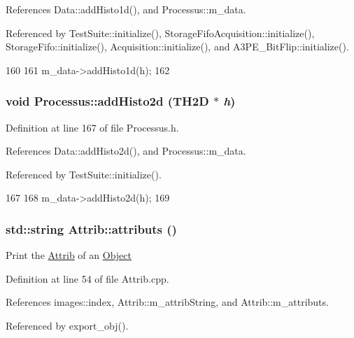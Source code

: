 References Data::addHisto1d(), and Processus::m\_\-data.

Referenced by TestSuite::initialize(), StorageFifoAcquisition::initialize(), StorageFifo::initialize(), Acquisition::initialize(), and A3PE\_\-BitFlip::initialize().


\begin{DoxyCode}
160                            {
161     m_data->addHisto1d(h);
162   }
\end{DoxyCode}
\hypertarget{classProcessus_ac1ed1aed5edaeabdf18aa56775440471}{
\subsubsection[{addHisto2d}]{\setlength{\rightskip}{0pt plus 5cm}void Processus::addHisto2d (TH2D $\ast$ {\em h})}}
\label{classProcessus_ac1ed1aed5edaeabdf18aa56775440471}


Definition at line 167 of file Processus.h.

References Data::addHisto2d(), and Processus::m\_\-data.

Referenced by TestSuite::initialize().


\begin{DoxyCode}
167                            {
168     m_data->addHisto2d(h);
169   }
\end{DoxyCode}
\hypertarget{classAttrib_aee7bbf16b144887f196e1341b24f8a26}{
\subsubsection[{attributs}]{\setlength{\rightskip}{0pt plus 5cm}std::string Attrib::attributs ()}}
\label{classAttrib_aee7bbf16b144887f196e1341b24f8a26}
Print the \hyperlink{classAttrib}{Attrib} of an \hyperlink{classObject}{Object} 

Definition at line 54 of file Attrib.cpp.

References images::index, Attrib::m\_\-attribString, and Attrib::m\_\-attributs.

Referenced by export\_\-obj().


